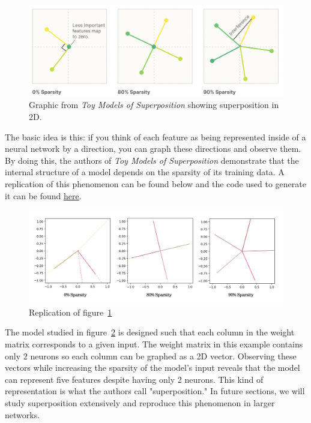 \documentclass{article} %
\begin{document}
\begin{figure}[h]
    \centering
    \includegraphics[width=0.55\linewidth]{introduction/images/introduction_anthropic_graphic_.png}
    \captionsetup{font=footnotesize} %
    \caption{
        Graphic from \textit{Toy Models of Superposition} showing superposition
        in 2D.
    }
    \label{fig:section1_anthropic}
\end{figure}

The basic idea is this: if you think of each feature as being represented inside of a
neural network by a direction, you can graph these directions and observe them.
By doing this, the authors of \textit{Toy Models of Superposition} demonstrate that
the internal structure of a model depends on the sparsity of its training data.
A replication of this phenomenon can be found below and the code used to 
generate it can be found 
\href{https://github.com/zroe1/toy-models-of-superposition/blob/main/introduction/introduction.ipynb}{here}.\\ 

\begin{figure}[h]
    \centering
    \includegraphics[width=0.6\linewidth]{introduction/images/introduction_replicated_graphic.png}
    \captionsetup{font=footnotesize} %
    \caption{Replication of figure~\ref{fig:section1_anthropic}}
    \label{fig:section1_replication}
\end{figure}

The model studied in  figure~\ref{fig:section1_replication} is designed such that 
each column in the weight matrix corresponds to a  given input. The weight
matrix in this example contains only 2 neurons so each column can be graphed as
a 2D vector. Observing these vectors while increasing the sparsity of the model's input reveals
that the model can represent five features despite having only 2 neurons. This 
kind of representation is what the authors call "superposition." In future sections, we will study 
superposition extensively and reproduce this phenomenon in larger networks.
\end{document}

